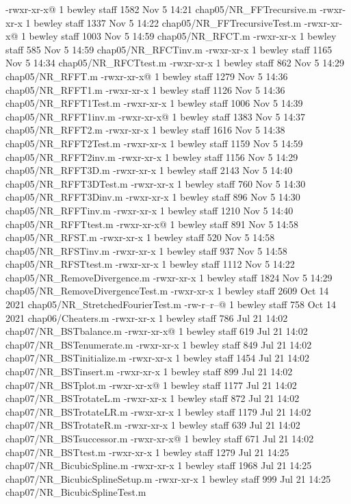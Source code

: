 -rwxr-xr-x@ 1 bewley  staff   1582 Nov  5 14:21 chap05/NR_FFTrecursive.m
-rwxr-xr-x  1 bewley  staff   1337 Nov  5 14:22 chap05/NR_FFTrecursiveTest.m
-rwxr-xr-x@ 1 bewley  staff   1003 Nov  5 14:59 chap05/NR_RFCT.m
-rwxr-xr-x  1 bewley  staff    585 Nov  5 14:59 chap05/NR_RFCTinv.m
-rwxr-xr-x  1 bewley  staff   1165 Nov  5 14:34 chap05/NR_RFCTtest.m
-rwxr-xr-x  1 bewley  staff    862 Nov  5 14:29 chap05/NR_RFFT.m
-rwxr-xr-x@ 1 bewley  staff   1279 Nov  5 14:36 chap05/NR_RFFT1.m
-rwxr-xr-x  1 bewley  staff   1126 Nov  5 14:36 chap05/NR_RFFT1Test.m
-rwxr-xr-x  1 bewley  staff   1006 Nov  5 14:39 chap05/NR_RFFT1inv.m
-rwxr-xr-x@ 1 bewley  staff   1383 Nov  5 14:37 chap05/NR_RFFT2.m
-rwxr-xr-x  1 bewley  staff   1616 Nov  5 14:38 chap05/NR_RFFT2Test.m
-rwxr-xr-x  1 bewley  staff   1159 Nov  5 14:59 chap05/NR_RFFT2inv.m
-rwxr-xr-x  1 bewley  staff   1156 Nov  5 14:29 chap05/NR_RFFT3D.m
-rwxr-xr-x  1 bewley  staff   2143 Nov  5 14:40 chap05/NR_RFFT3DTest.m
-rwxr-xr-x  1 bewley  staff    760 Nov  5 14:30 chap05/NR_RFFT3Dinv.m
-rwxr-xr-x  1 bewley  staff    896 Nov  5 14:30 chap05/NR_RFFTinv.m
-rwxr-xr-x  1 bewley  staff   1210 Nov  5 14:40 chap05/NR_RFFTtest.m
-rwxr-xr-x@ 1 bewley  staff    891 Nov  5 14:58 chap05/NR_RFST.m
-rwxr-xr-x  1 bewley  staff    520 Nov  5 14:58 chap05/NR_RFSTinv.m
-rwxr-xr-x  1 bewley  staff    937 Nov  5 14:58 chap05/NR_RFSTtest.m
-rwxr-xr-x  1 bewley  staff   1112 Nov  5 14:22 chap05/NR_RemoveDivergence.m
-rwxr-xr-x  1 bewley  staff   1824 Nov  5 14:29 chap05/NR_RemoveDivergenceTest.m
-rwxr-xr-x  1 bewley  staff   2609 Oct 14  2021 chap05/NR_StretchedFourierTest.m
-rw-r--r--@ 1 bewley  staff    758 Oct 14  2021 chap06/Cheaters.m
-rwxr-xr-x  1 bewley  staff    786 Jul 21 14:02 chap07/NR_BSTbalance.m
-rwxr-xr-x@ 1 bewley  staff    619 Jul 21 14:02 chap07/NR_BSTenumerate.m
-rwxr-xr-x  1 bewley  staff    849 Jul 21 14:02 chap07/NR_BSTinitialize.m
-rwxr-xr-x  1 bewley  staff   1454 Jul 21 14:02 chap07/NR_BSTinsert.m
-rwxr-xr-x  1 bewley  staff    899 Jul 21 14:02 chap07/NR_BSTplot.m
-rwxr-xr-x@ 1 bewley  staff   1177 Jul 21 14:02 chap07/NR_BSTrotateL.m
-rwxr-xr-x  1 bewley  staff    872 Jul 21 14:02 chap07/NR_BSTrotateLR.m
-rwxr-xr-x  1 bewley  staff   1179 Jul 21 14:02 chap07/NR_BSTrotateR.m
-rwxr-xr-x  1 bewley  staff    639 Jul 21 14:02 chap07/NR_BSTsuccessor.m
-rwxr-xr-x@ 1 bewley  staff    671 Jul 21 14:02 chap07/NR_BSTtest.m
-rwxr-xr-x  1 bewley  staff   1279 Jul 21 14:25 chap07/NR_BicubicSpline.m
-rwxr-xr-x  1 bewley  staff   1968 Jul 21 14:25 chap07/NR_BicubicSplineSetup.m
-rwxr-xr-x  1 bewley  staff    999 Jul 21 14:25 chap07/NR_BicubicSplineTest.m

